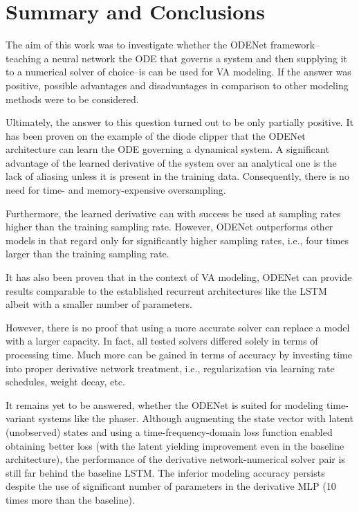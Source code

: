 \chapter{Summary and Conclusions}
\label{chapter:conclusions}

The aim of this work was to investigate whether the ODENet framework--teaching a neural network the \ac{ODE} that governs a system and then supplying it to a numerical solver of choice--is can be used for \ac{VA} modeling. If the answer was positive, possible advantages and disadvantages in comparison to other modeling methods were to be considered.

Ultimately, the answer to this question turned out to be only partially positive. It has been proven on the example of the diode clipper that the ODENet architecture can learn the \ac{ODE} governing a dynamical system. A significant advantage of the learned derivative of the system over an analytical one is the lack of aliasing unless it is present in the training data. Consequently, there is no need for time- and memory-expensive oversampling.

Furthermore, the learned derivative can with success be used at sampling rates higher than the training sampling rate. However, ODENet outperforms other models in that regard only for significantly higher sampling rates, i.e., four times larger than the training sampling rate.

It has also been proven that in the context of \ac{VA} modeling, ODENet can provide results comparable to the established recurrent architectures like the \ac{LSTM} albeit with a smaller number of parameters.

However, there is no proof that using a more accurate solver can replace a model with a larger capacity. In fact, all tested solvers differed solely in terms of processing time. Much more can be gained in terms of accuracy by investing time into proper derivative network treatment, i.e., regularization via learning rate schedules, weight decay, etc.

It remains yet to be answered, whether the ODENet is suited for modeling time-variant systems like the phaser. Although augmenting the state vector with latent (unobserved) states and using a time-frequency-domain loss function enabled obtaining better loss (with the latent yielding improvement even in the baseline architecture), the performance of the derivative network-numerical solver pair is still far behind the baseline \ac{LSTM}. The inferior modeling accuracy persists despite the use of significant number of parameters in the derivative \ac{MLP} (10 times more than the baseline).

